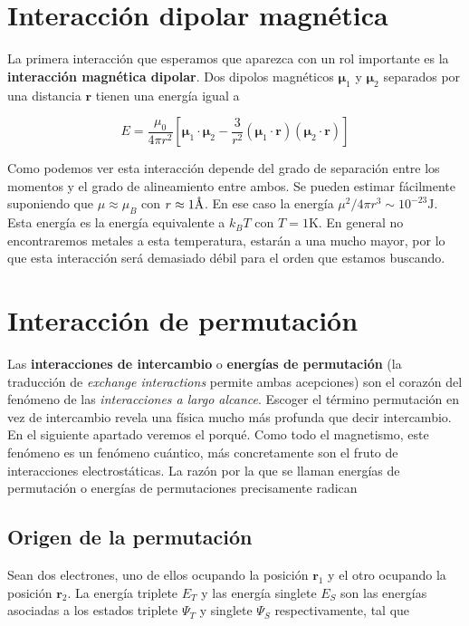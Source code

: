 \documentclass[12pt,a4paper]{book}
\numberwithin{equation}{section}
\numberwithin{figure}{section}
\newcommand{\ccorchetes}[1]{\left[ #1  \right]}
\newcommand{\rn}{\mathbf{r}}
\newcommand{\mun}{\boldsymbol{\mu}}
\begin{document}
\section{Interacción dipolar magnética}

La primera interacción que esperamos que aparezca con un rol importante es la \textbf{interacción magnética dipolar}. Dos dipolos magnéticos $\mun_1$ y $\mun_2$ separados por una distancia $\rn$ tienen una energía igual a

\begin{equation}
    E = \frac{\mu_0}{4 \pi r^2} \ccorchetes{\mun_1 \cdot \mun_2 - \frac{3}{r^2} (\mun_1 \cdot \rn) (\mun_2 \cdot \rn)}
\end{equation}

Como podemos ver esta interacción depende del grado de separación entre los momentos y el grado de alineamiento entre ambos. Se pueden estimar fácilmente suponiendo que $\mu \approx \mu_B$ con $r \approx 1 \text{\r{A}}$. En ese caso la energía $\mu^2 / 4 \pi r^3 \sim 10^{-23} \text{J}$. Esta energía es la energía equivalente a $k_BT$ con $T=1 \mathrm{K}$. En general no encontraremos metales a esta temperatura, estarán a una mucho mayor, por lo que esta interacción será demasiado débil para el orden que estamos buscando. \\

\section{Interacción de permutación}

Las \textbf{interacciones de intercambio} o \textbf{energías de permutación} (la traducción de \textit{exchange interactions} permite ambas acepciones) son el corazón del fenómeno de las \textit{interacciones a largo alcance}. Escoger el término permutación en vez de intercambio revela una física mucho más profunda que decir intercambio. En el siguiente apartado veremos el porqué. Como todo el magnetismo, este fenómeno es un fenómeno cuántico, más concretamente son el fruto de interacciones electrostáticas. La razón por la que se llaman energías de permutación o energías de permutaciones precisamente radican

\subsection{Origen de la permutación}
Sean dos electrones, uno de ellos ocupando la posición $\rn_1$ y el otro ocupando la posición $\rn_2$. La energía triplete $E_T$ y las energía singlete $E_S$ son las energías asociadas a los estados triplete  $\Psi_T$ y singlete $\Psi_S$ respectivamente, tal que
\end{document}
